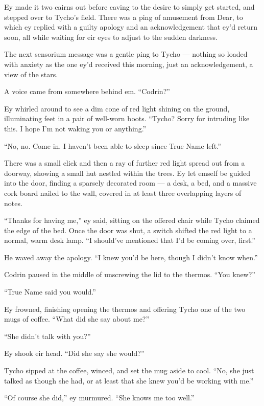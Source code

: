 Ey made it two cairns out before caving to the desire to simply get started, and stepped over to Tycho's field. There was a ping of amusement from Dear, to which ey replied with a guilty apology and an acknowledgement that ey'd return soon, all while waiting for eir eyes to adjust to the sudden darkness.

The next sensorium message was a gentle ping to Tycho — nothing so loaded with anxiety as the one ey'd received this morning, just an acknowledgement, a view of the stars.

A voice came from somewhere behind em. ``Codrin?''

Ey whirled around to see a dim cone of red light shining on the ground, illuminating feet in a pair of well-worn boots. ``Tycho? Sorry for intruding like this. I hope I'm not waking you or anything.''

``No, no. Come in. I haven't been able to sleep since True Name left.''

There was a small click and then a ray of further red light spread out from a doorway, showing a small hut nestled within the trees. Ey let emself be guided into the door, finding a sparsely decorated room — a desk, a bed, and a massive cork board nailed to the wall, covered in at least three overlapping layers of notes.

``Thanks for having me,'' ey said, sitting on the offered chair while Tycho claimed the edge of the bed. Once the door was shut, a switch shifted the red light to a normal, warm desk lamp. ``I should've mentioned that I'd be coming over, first.''

He waved away the apology. ``I knew you'd be here, though I didn't know when.''

Codrin paused in the middle of unscrewing the lid to the thermos. ``You knew?''

``True Name said you would.''

Ey frowned, finishing opening the thermos and offering Tycho one of the two mugs of coffee. ``What did she say about me?''

``She didn't talk with you?''

Ey shook eir head. ``Did she say she would?''

Tycho sipped at the coffee, winced, and set the mug aside to cool. ``No, she just talked as though she had, or at least that she knew you'd be working with me.''

``Of course she did,'' ey murmured. ``She knows me too well.''

